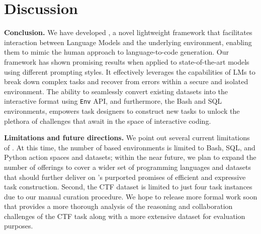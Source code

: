 \section{Discussion}
\label{sec:conclusion}

\textbf{Conclusion.} We have developed \benchmark{}, a novel lightweight framework that facilitates interaction between Language Models and the underlying environment, enabling them to mimic the human approach to language-to-code generation. Our framework has shown promising results when applied to state-of-the-art models using different prompting styles. It effectively leverages the capabilities of LMs to break down complex tasks and recover from errors within a secure and isolated environment. The ability to seamlessly convert existing datasets into the interactive format using \texttt{\benchmark{}Env} API, and furthermore, the Bash and SQL environments, empowers task designers to construct new tasks to unlock the plethora of challenges that await in the space of interactive coding.

\textbf{Limitations and future directions.} We point out several current limitations of \benchmark{}. At this time, the number of \benchmark{} based environments is limited to Bash, SQL, and Python action spaces and datasets; within the near future, we plan to expand the number of offerings to cover a wider set of programming languages and datasets that should further deliver on \benchmark{}'s purported promises of efficient and expressive task construction. Second, the CTF dataset is limited to just four task instances due to our manual curation procedure. We hope to release more formal work soon that provides a more thorough analysis of the reasoning and collaboration challenges of the CTF task along with a more extensive dataset for evaluation purposes.
